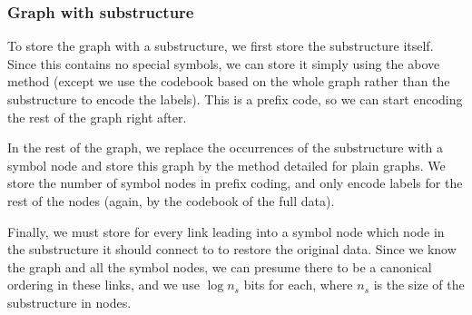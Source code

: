 \documentclass{article}
\begin{document}
\subsubsection*{Graph with substructure}  

To store the graph with a substructure, we first store the substructure itself. Since this contains no special symbols, we can store it simply using the above method (except we use the codebook based on the whole graph rather than the substructure to encode the labels). This is a prefix code, so we can start encoding the rest of the graph right after.

In the rest of the graph, we replace the occurrences of the substructure with a symbol node and store this graph by the method detailed for plain graphs. We store the number of symbol nodes in prefix coding, and only encode labels for the rest of the nodes (again, by the codebook of the full data).

Finally, we must store for every link leading into a symbol node which node in the substructure it should connect to to restore the original data. Since we know the graph and all the symbol nodes, we can presume there to be a canonical ordering in these links, and we use $\log n_s$ bits for each, where $n_s$ is the size of the substructure in nodes.

 

\end{document}
